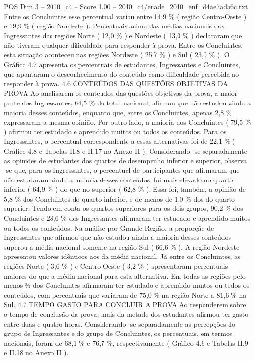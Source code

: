 \begin{textsample}{POS Dim 3 – 2010\_c4 – Score 1.00 – 2010\_c4/enade\_2010\_enf\_d4ae7ada6c.txt}
Entre os Concluintes esse percentual variou entre 14,9 \% ( região Centro-Oeste ) e 19,9 \% ( região Nordeste ).
Percentuais acima das médias nacionais dos Ingressantes das regiões Norte ( 12,0 \% ) e Nordeste ( 13,0 \% ) declararam que não tiveram qualquer dificuldade para responder à prova.
Entre os Concluintes, esta situação aconteceu nas regiões Nordeste ( 25,7 \% ) e Sul ( 23,0 \% ).
O Gráfico 4.7 apresenta os percentuais de estudantes, Ingressantes e Concluintes, que apontaram o desconhecimento do conteúdo como dificuldade percebida ao responder à prova. 4.6 CONTEÚDOS DAS QUESTÕES OBJETIVAS DA PROVA Ao analisarem os conteúdos das questões objetivas da prova, a maior parte dos Ingressantes, 64,5 \% do total nacional, afirmou que não estudou ainda a maioria desses conteúdos, enquanto que, entre os Concluintes, apenas 2,8 \% expressaram a mesma opinião.
Por outro lado, a maioria dos Concluintes ( 79,5 \% ) afirmou ter estudado e aprendido muitos ou todos os conteúdos.
Para os Ingressantes, o percentual correspondente a essas alternativas foi de 22,1 \% ( Gráfico 4.8 e Tabelas II.8 e II.17 no Anexo II ).
Considerando -se separadamente as opiniões de estudantes dos quartos de desempenho inferior e superior, observa -se que, para os Ingressantes, o percentual de participantes que afirmaram que não estudaram ainda a maioria desses conteúdos, foi mais elevado no quarto inferior ( 64,9 \% ) do que no superior ( 62,8 \% ).
Essa foi, também, a opinião de 5,8 \% dos Concluintes do quarto inferior, e de menos de 1,0 \% dos do quarto superior.
Tendo em conta os quartos superiores para os dois grupos, 90,2 \% dos Concluintes e 28,6 \% dos Ingressantes afirmaram ter estudado e aprendido muitos ou todos os conteúdos.
Na análise por Grande Região, a proporção de Ingressantes que afirmou que não estudou ainda a maioria desses conteúdos superou a média nacional somente na região Sul ( 66,6 \% ).
A região Nordeste apresentou valores idênticos aos da média nacional.
Já entre os Concluintes, as regiões Norte ( 3,6 \% ) e Centro-Oeste ( 3,2 \% ) apresentaram percentuais maiores do que a média nacional para esta alternativa.
Em todas as regiões pelo menos ¾ dos Concluintes afirmaram ter estudado e aprendido muitos ou todos os conteúdos, com percentuais que variaram de 75,0 \% na região Norte a 81,6 \% na Sul. 4.7 TEMPO GASTO PARA CONCLUIR A PROVA Ao responderem sobre o tempo de conclusão da prova, mais da metade dos estudantes afirmou ter gasto entre duas e quatro horas.
Considerando -se separadamente as percepções do grupo de Ingressantes e do grupo de Concluintes, os percentuais, em termos nacionais, foram de 68,1 \% e 76,7 \%, respectivamente ( Gráfico 4.9 e Tabelas II.9 e II.18 no Anexo II ).

\end{textsample}
